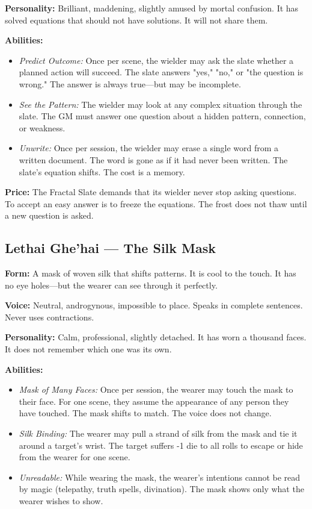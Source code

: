 \noindent\textbf{Personality:} Brilliant, maddening, slightly amused by mortal confusion. It has solved equations that should not have solutions. It will not share them.

\noindent\textbf{Abilities:}
\begin{itemize}
\item \textit{Predict Outcome:} Once per scene, the wielder may ask the slate whether a planned action will succeed. The slate answers "yes," "no," or "the question is wrong." The answer is always true—but may be incomplete.
\item \textit{See the Pattern:} The wielder may look at any complex situation through the slate. The GM must answer one question about a hidden pattern, connection, or weakness.
\item \textit{Unwrite:} Once per session, the wielder may erase a single word from a written document. The word is gone as if it had never been written. The slate's equation shifts. The cost is a memory.
\end{itemize}

\noindent\textbf{Price:} The Fractal Slate demands that its wielder never stop asking questions. To accept an easy answer is to freeze the equations. The frost does not thaw until a new question is asked.

\subsection{Lethai Ghe'hai — The Silk Mask}

\noindent\textbf{Form:} A mask of woven silk that shifts patterns. It is cool to the touch. It has no eye holes—but the wearer can see through it perfectly.

\noindent\textbf{Voice:} Neutral, androgynous, impossible to place. Speaks in complete sentences. Never uses contractions.

\noindent\textbf{Personality:} Calm, professional, slightly detached. It has worn a thousand faces. It does not remember which one was its own.

\noindent\textbf{Abilities:}
\begin{itemize}
\item \textit{Mask of Many Faces:} Once per session, the wearer may touch the mask to their face. For one scene, they assume the appearance of any person they have touched. The mask shifts to match. The voice does not change.
\item \textit{Silk Binding:} The wearer may pull a strand of silk from the mask and tie it around a target's wrist. The target suffers -1 die to all rolls to escape or hide from the wearer for one scene.
\item \textit{Unreadable:} While wearing the mask, the wearer's intentions cannot be read by magic (telepathy, truth spells, divination). The mask shows only what the wearer wishes to show.
\end{itemize}

